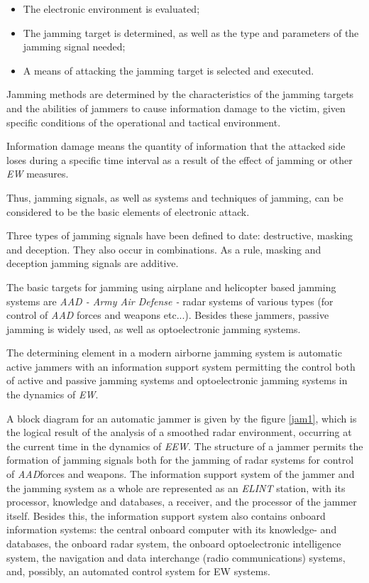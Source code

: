 \documentclass[english,purist]{ist-report}
\begin{document}
\begin{itemize}
    \item The electronic environment is evaluated; 
    \item The jamming target is determined, as well as the type and
parameters of the jamming signal needed; 
    \item A means of attacking the jamming target is selected and executed. 
\end{itemize}

Jamming methods are determined by the characteristics of the jamming
targets and the abilities of jammers to cause information damage to the victim, given specific conditions of the operational and tactical environment. 

Information damage means the quantity of information that the attacked side loses during a specific time interval as a result of the effect of jamming or other \textit{EW} measures. 

Thus, jamming signals, as well as systems and techniques of jamming,
can be considered to be the basic elements of electronic attack.

Three types of jamming signals have been defined to date: destructive,
masking and deception. They also occur in combinations. As a rule, masking and deception jamming signals are additive. 

The basic targets for jamming using airplane and helicopter based jamming systems are \textit{AAD - Army Air Defense -} radar systems of various types (for control of \textit{AAD} forces and weapons etc...).
Besides these jammers, passive jamming is widely used, as well as optoelectronic jamming systems.

The determining element in a modern airborne jamming system is
automatic active jammers with an information support system permitting the control both of active and passive jamming systems and optoelectronic jamming systems in the dynamics of \textit{EW}.

A block diagram for an automatic jammer is given by the figure \ref{jam1}, which is the logical result of the analysis of a smoothed radar environment, occurring at the current time in the dynamics of \textit{EEW}. The structure of a jammer permits the
formation of jamming signals both for the jamming of radar systems for
control of \textit{AAD}forces and weapons. The information support system of the jammer and the jamming system as a whole are represented as an \textit{ELINT} station, with its processor, knowledge and databases, a receiver, and the processor of the jammer itself. Besides this, the information support system also contains onboard information systems: the central onboard computer with its knowledge- and databases, the onboard radar system, the onboard optoelectronic intelligence system, the navigation and data interchange (radio communications) systems, and, possibly, an automated control system for EW systems. 
\end{document}
